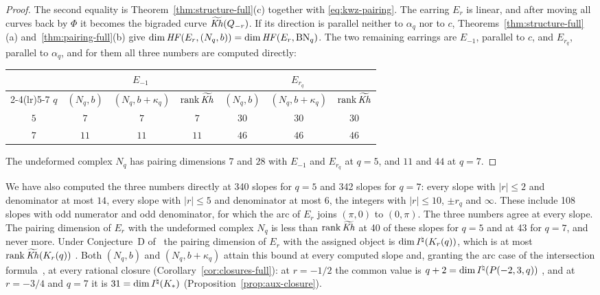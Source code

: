 \begin{proof}
The second equality is Theorem~\ref{thm:structure-full}(c) together with \eqref{eq:kwz-pairing}.  The
earring $E_r$ is linear, and after moving all curves back by $\Phi$ it becomes the bigraded curve
$\widetilde{\mathit{Kh}}(Q_{-r})$.  If its direction is parallel neither to $\alpha_q$ nor to $c$,
Theorems~\ref{thm:structure-full}(a) and~\ref{thm:pairing-full}(b) give
$\dim\mathit{HF}(E_r,(N_q,b))=\dim\mathit{HF}(E_r,\mathrm{BN}_q)$.  The two remaining earrings are $E_{-1}$, parallel
to $c$, and $E_{r_q}$, parallel to $\alpha_q$, and for them all three numbers are computed directly:
\begin{center}
\begin{tabular}{ccccccc}
\toprule
 & \multicolumn{3}{c}{$E_{-1}$} & \multicolumn{3}{c}{$E_{r_q}$}\\
\cmidrule(lr){2-4}\cmidrule(lr){5-7}
$q$ & $(N_q,b)$ & $(N_q,b+\kappa_q)$ & $\operatorname{rank}\widetilde{\mathit{Kh}}$ & $(N_q,b)$ & $(N_q,b+\kappa_q)$ &
 $\operatorname{rank}\widetilde{\mathit{Kh}}$\\
\midrule
$5$ & $7$ & $7$ & $7$ & $30$ & $30$ & $30$\\
$7$ & $11$ & $11$ & $11$ & $46$ & $46$ & $46$\\
\bottomrule
\end{tabular}
\end{center}
The undeformed complex $N_q$ has pairing dimensions $7$ and $28$ with $E_{-1}$ and $E_{r_q}$ at $q=5$, and
$11$ and $44$ at $q=7$.
\end{proof}

We have also computed the three numbers directly at 340 slopes for $q=5$ and 342 slopes for $q=7$:
every slope with $|r|\le2$ and denominator at most $14$, every slope with $|r|\le5$ and denominator
at most $6$, the integers with $|r|\le10$, $\pm r_q$ and $\infty$.  These include 108 slopes with odd
numerator and odd denominator, for which the arc of $E_r$ joins $(\pi,0)$ to $(0,\pi)$.  The three numbers agree
at every slope.  The pairing dimension of $E_r$ with the undeformed complex $N_q$ is less than
$\operatorname{rank}\widetilde{\mathit{Kh}}$ at 40 of these slopes for $q=5$ and at 43 for $q=7$, and never more.  Under
Conjecture~D of~\cite{CHKK} the pairing dimension of $E_r$ with the assigned object is
$\dim I^{\natural}(K_r(q))$, which is at most
$\operatorname{rank}\widetilde{\mathit{Kh}}(K_r(q))$ \cite{KM2}.  Both $(N_q,b)$ and $(N_q,b+\kappa_q)$ attain this bound at every computed slope and, granting the arc case of the intersection formula~\cite[Thm.~5.25]{KWZ}, at every rational closure (Corollary~\ref{cor:closures-full}): at $r=-1/2$ the common value is $q+2=\dim I^{\natural}(P(-2,3,q))$
\cite[Thm.~1.1]{WuebbenII}, and at $r=-3/4$ and $q=7$ it is $31=\dim I^{\natural}(K_*)$
(Proposition~\ref{prop:aux-closure}).

